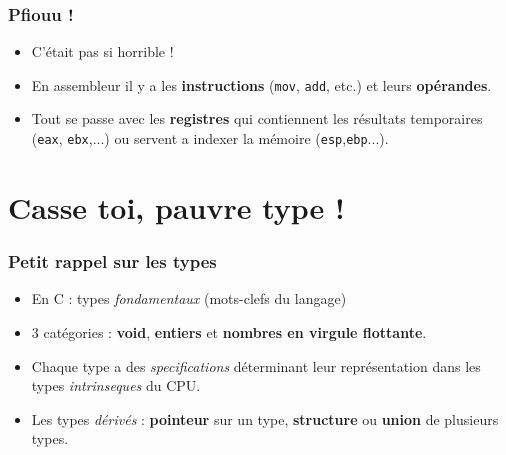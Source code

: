\documentclass{beamer}
\begin{document}
\begin{frame}
\frametitle{Pfiouu !}
\begin{itemize}
\item C'était pas si horrible !
\item En assembleur il y a les \textbf{instructions} (\lstinline[language={[x86masm]Assembler}]+mov+, \lstinline[language={[x86masm]Assembler}]+add+, etc.) et leurs \textbf{opérandes}.
\item Tout se passe avec les \textbf{registres} qui contiennent les résultats temporaires (\texttt{eax}, \texttt{ebx},...) ou servent a indexer la mémoire (\texttt{esp},\texttt{ebp}...).
\end{itemize}
\end{frame}

\section{Casse toi, pauvre type !}

\begin{frame}
\frametitle{Petit rappel sur les types} 

\begin{itemize}

\item En C : types \textit{fondamentaux} (mots-clefs du langage) 
\item 3 catégories : \textbf{void}, \textbf{entiers} et \textbf{nombres en virgule flottante}.
\item Chaque type a des \textit{specifications} déterminant leur représentation dans les types \textit{intrinseques} du CPU.
\pause 
\item Les types \textit{dérivés} : \textbf{pointeur} sur un type, \textbf{structure} ou \textbf{union} de plusieurs types.


\end{itemize}

\end{frame}
\end{document}
